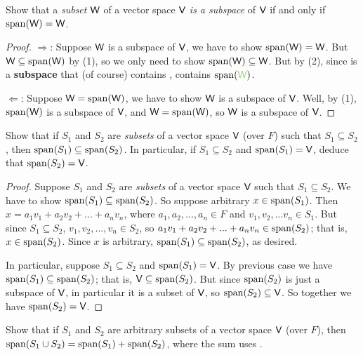 \begin{exercise} \label{exercise 1.4.12}
Show that a \emph{subset} \(\W\) of a vector space \(\textsf{V}\) \emph{is a subspace} of \(\textsf{V}\) if and only if \(\operatorname{span}(\textsf{W}) = \textsf{W}\).
\end{exercise}

\begin{proof}
\(\Longrightarrow\): Suppose \(\W\) is a subspace of \(\textsf{V}\), we have to show \(\operatorname{span}(\textsf{W}) = \textsf{W}\).
But \(\textsf{W} \subseteq \operatorname{span}(\textsf{W})\) by (1), so we only need to show \(\operatorname{span}(\textsf{W}) \subseteq \textsf{W}\).
But by (2), since \BLUE{\(\W\)} is a \textbf{subspace} that (of course) contains \GREEN{\(\W\)}, \BLUE{\(\W\)} contains \(\spann(\GREEN{\W})\).

\(\Longleftarrow\): Suppose \(\textsf{W} = \operatorname{span}(\textsf{W})\), we have to show \(\W\) is a subspace of \(\textsf{V}\).
Well, by (1), \(\operatorname{span}(\textsf{W})\) is a subspace of \(\textsf{V}\), and \(\textsf{W} = \operatorname{span}(\textsf{W})\), so \(\W\) is a subspace of \(\textsf{V}\).
\end{proof}

\begin{exercise} \label{exercise 1.4.13}
Show that if \(S_1\) and \(S_2\) are \emph{subsets} of a vector space \(\textsf{V}\) (over \(F\)) such that \(S_1 \subseteq S_2\), then \(\operatorname{span}(S_1) \subseteq \operatorname{span}(S_2)\).
In particular, if \(S_1 \subseteq S_2\) and \(\operatorname{span}(S_1) = \textsf{V}\), deduce that \(\operatorname{span}(S_2) = \textsf{V}\).
\end{exercise}

\begin{proof}
Suppose \(S_1\) and \(S_2\) are \emph{subsets} of a vector space \(\textsf{V}\) such that \(S_1 \subseteq S_2\).
We have to show \(\operatorname{span}(S_1) \subseteq \operatorname{span}(S_2)\).
So suppose arbitrary \(x \in \operatorname{span}(S_1)\).
Then \(x = a_1 v_1 + a_2 v_2 + ... + a_n v_n\), where \(a_1, a_2, ..., a_n \in F\) and \(v_1, v_2, ... v_n \in S_1\).
But since \(S_1 \subseteq S_2\), \(v_1, v_2, ..., v_n \in S_2\), so \(a_1 v_1 + a_2 v_2 + ... + a_n v_n \in \operatorname{span}(S_2)\);
that is, \(x \in \operatorname{span}(S_2)\).
Since \(x\) is arbitrary, \(\operatorname{span}(S_1) \subseteq \operatorname{span}(S_2)\), as desired.

In particular, suppose \(S_1 \subseteq S_2\) and \(\operatorname{span}(S_1) = \textsf{V}\).
By previous case we have \(\operatorname{span}(S_1) \subseteq \operatorname{span}(S_2)\);
that is, \(\textsf{V} \subseteq \operatorname{span}(S_2)\).
But since \(\operatorname{span}(S_2)\) is just a subspace of \(\textsf{V}\), in particular it is a subset of \(\textsf{V}\), so \(\operatorname{span}(S_2) \subseteq \textsf{V}\).
So together we have \(\operatorname{span}(S_2) = \textsf{V}\).
\end{proof}

\begin{exercise} \label{exercise 1.4.14}
Show that if \(S_1\) and \(S_2\) are arbitrary subsets of a vector space \(\textsf{V}\) (over \(F\)), then \(\operatorname{span}(S_1 \cup S_2) = \operatorname{span}(S_1) + \operatorname{span}(S_2)\), where the sum uses .
\end{exercise}

